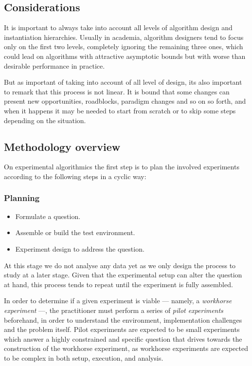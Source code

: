 \subsection{Considerations}
\label{SUBSECTION:EXPERIMENTAL_ALGORITMICS_CONSIDERATIONS}
It is important to always take into account all levels of algorithm design and instantiation hierarchies. Usually in academia, algorithm designers tend to focus only on the first two levels, completely ignoring the remaining three ones, which could lead on algorithms with attractive asymptotic bounds but with worse than desirable performance in practice.

But as important of taking into account of all level of design, its also important to remark that this process is not linear. It is bound that some changes can present new opportunities, roadblocks, paradigm changes and so on so forth, and when it happens it may be needed to start from scratch or to skip some steps depending on the situation.


\subsection{Methodology overview}

On experimental algorithmics the first step is to plan the involved experiments according to the following steps in a cyclic way:

\subsubsection{Planning}
\begin{itemize}
    \item Formulate a question.
    \item Assemble or build the test environment.
    \item Experiment design to address the question.
\end{itemize}

At this stage we do not analyse any data yet as we only design the process to study at a later stage. Given that the experimental setup can alter the question at hand, this process tends to repeat until the experiment is fully assembled.

In order to determine if a given experiment is viable --- namely, a \emph{workhorse experiment} ---, the practitioner must perform a series of \emph{pilot experiments} beforehand, in order to understand the environment, implementation challenges and the problem itself. Pilot experiments are expected to be small experiments which answer a highly constrained and specific question that drives towards the construction of the workhorse experiment, as workhorse experiments are expected to be complex in both setup, execution, and analysis.

